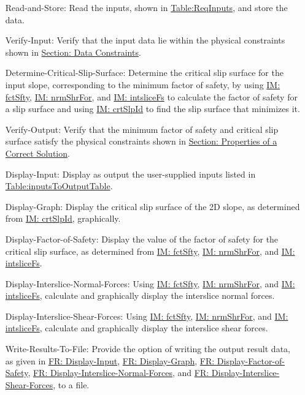 \documentclass[12pt]{article}
\begin{document}
\begin{itemize}
\item[Read-and-Store:\phantomsection\label{readAndStore}]Read the inputs, shown in \hyperref[Table:ReqInputs]{Table:ReqInputs}, and store the data.
\item[Verify-Input:\phantomsection\label{verifyInput}]Verify that the input data lie within the physical constraints shown in \hyperref[Sec:DataConstraints]{Section: Data Constraints}.
\item[Determine-Critical-Slip-Surface:\phantomsection\label{determineCritSlip}]Determine the critical slip surface for the input slope, corresponding to the minimum factor of safety, by using \hyperref[IM:fctSfty]{IM: fctSfty}, \hyperref[IM:nrmShrFor]{IM: nrmShrFor}, and \hyperref[IM:intsliceFs]{IM: intsliceFs} to calculate the factor of safety for a slip surface and using \hyperref[IM:crtSlpId]{IM: crtSlpId} to find the slip surface that minimizes it.
\item[Verify-Output:\phantomsection\label{verifyOutput}]Verify that the minimum factor of safety and critical slip surface satisfy the physical constraints shown in \hyperref[Sec:CorSolProps]{Section: Properties of a Correct Solution}.
\item[Display-Input:\phantomsection\label{displayInput}]Display as output the user-supplied inputs listed in \hyperref[Table:inputsToOutputTable]{Table:inputsToOutputTable}.
\item[Display-Graph:\phantomsection\label{displayGraph}]Display the critical slip surface of the 2D slope, as determined from \hyperref[IM:crtSlpId]{IM: crtSlpId}, graphically.
\item[Display-Factor-of-Safety:\phantomsection\label{displayFS}]Display the value of the factor of safety for the critical slip surface, as determined from \hyperref[IM:fctSfty]{IM: fctSfty}, \hyperref[IM:nrmShrFor]{IM: nrmShrFor}, and \hyperref[IM:intsliceFs]{IM: intsliceFs}.
\item[Display-Interslice-Normal-Forces:\phantomsection\label{displayNormal}]Using \hyperref[IM:fctSfty]{IM: fctSfty}, \hyperref[IM:nrmShrFor]{IM: nrmShrFor}, and \hyperref[IM:intsliceFs]{IM: intsliceFs}, calculate and graphically display the interslice normal forces.
\item[Display-Interslice-Shear-Forces:\phantomsection\label{displayShear}]Using \hyperref[IM:fctSfty]{IM: fctSfty}, \hyperref[IM:nrmShrFor]{IM: nrmShrFor}, and \hyperref[IM:intsliceFs]{IM: intsliceFs}, calculate and graphically display the interslice shear forces.
\item[Write-Results-To-File:\phantomsection\label{writeToFile}]Provide the option of writing the output result data, as given in \hyperref[displayInput]{FR: Display-Input}, \hyperref[displayGraph]{FR: Display-Graph}, \hyperref[displayFS]{FR: Display-Factor-of-Safety}, \hyperref[displayNormal]{FR: Display-Interslice-Normal-Forces}, and \hyperref[displayShear]{FR: Display-Interslice-Shear-Forces}, to a file.
\end{itemize}
\end{document}
